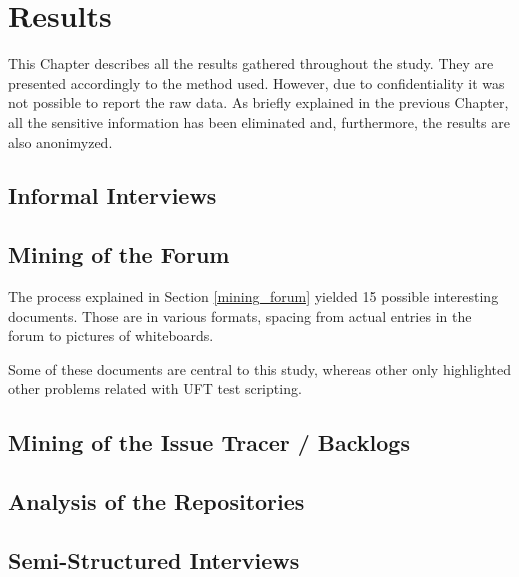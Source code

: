\chapter{Results}

This Chapter describes all the results gathered throughout the study. They are presented accordingly to the method used. However, due to confidentiality it was not possible to report the raw data. As briefly explained in the previous Chapter, all the sensitive information has been eliminated and, furthermore, the results are also anonimyzed.

\section{Informal Interviews}

\section{Mining of the Forum}
The process explained in Section \ref{mining_forum} yielded 15 possible interesting documents. Those are in various formats, spacing from actual entries in the forum to pictures of whiteboards.

Some of these documents are central to this study, whereas other only highlighted other problems related with UFT test scripting. 



\section{Mining of the Issue Tracer / Backlogs}

\section{Analysis of the Repositories}

\section{Semi-Structured Interviews}